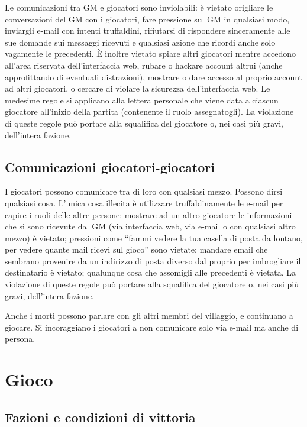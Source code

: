 \documentclass[a4paper,10pt]{article}
\begin{document}
Le comunicazioni tra GM e giocatori sono inviolabili: è vietato origliare le conversazioni del GM con i giocatori, fare pressione sul GM in qualsiasi modo, inviargli e-mail con intenti truffaldini, rifiutarsi di rispondere sinceramente alle sue domande sui messaggi ricevuti e qualsiasi azione che ricordi anche solo vagamente le precedenti.
È inoltre vietato spiare altri giocatori mentre accedono all'area riservata dell'interfaccia web, rubare o hackare account altrui (anche approfittando di eventuali distrazioni), mostrare o dare accesso al proprio account ad altri giocatori, o cercare di violare la sicurezza dell'interfaccia web.
Le medesime regole si applicano alla lettera personale che viene data a ciascun giocatore all'inizio della partita (contenente il ruolo assegnatogli).
La violazione di queste regole può portare alla squalifica del giocatore o, nei casi più gravi, dell'intera fazione.


\subsection{Comunicazioni giocatori-giocatori}

I giocatori possono comunicare tra di loro con qualsiasi mezzo. Possono dirsi qualsiasi cosa.
L’unica cosa illecita è utilizzare truffaldinamente le e-mail per capire i ruoli delle altre persone: mostrare ad un altro giocatore le informazioni che si sono ricevute dal GM (via interfaccia web, via e-mail o con qualsiasi altro mezzo) è vietato; pressioni come ``fammi vedere la tua casella di posta da lontano, per vedere quante mail ricevi sul gioco'' sono vietate; mandare email che sembrano provenire da un indirizzo di posta diverso dal proprio per imbrogliare il destinatario è vietato; qualunque cosa che assomigli alle precedenti è vietata. La violazione di queste regole può portare alla squalifica del giocatore o, nei casi più gravi, dell'intera fazione.

Anche i morti possono parlare con gli altri membri del villaggio, e continuano a giocare. Si incoraggiano i giocatori a non comunicare solo via e-mail ma anche di persona.


\pagebreak
\section{Gioco}


\subsection{Fazioni e condizioni di vittoria}
\end{document}
